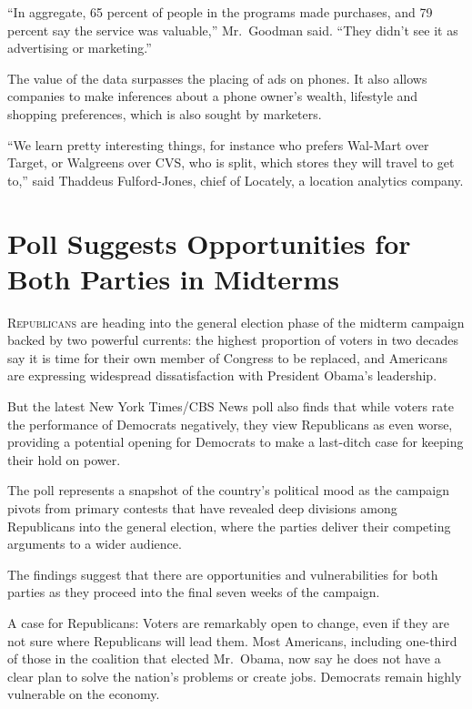 ﻿\documentclass[12pt]{article}
\begin{document}
``In aggregate, 65 percent of people in the programs made purchases, and 79 percent say the service
was valuable,'' Mr.~Goodman said. ``They didn't see it as advertising or marketing.''

The value of the data surpasses the placing of ads on phones. It also allows companies to make
inferences about a phone owner's wealth, lifestyle and shopping preferences, which is also sought by
marketers.

``We learn pretty interesting things, for instance who prefers Wal-Mart over Target, or Walgreens
over CVS, who is split, which stores they will travel to get to,'' said Thaddeus Fulford-Jones,
chief of Locately, a location analytics company.

\pagebreak
\section{Poll Suggests Opportunities for Both Parties in Midterms}

\lettrine{R}{epublicans} are heading into the general election phase of the
midterm campaign backed by two powerful currents: the highest proportion of voters in two decades
say it is time for their own member of Congress to be replaced, and Americans are expressing
widespread dissatisfaction with President Obama's leadership.

But the latest New York Times/CBS News poll also finds that while voters rate the performance of
Democrats negatively, they view Republicans as even worse, providing a potential opening for
Democrats to make a last-ditch case for keeping their hold on power.

The poll represents a snapshot of the country's political mood as the campaign pivots from primary
contests that have revealed deep divisions among Republicans into the general election, where the
parties deliver their competing arguments to a wider audience.

The findings suggest that there are opportunities and vulnerabilities for both parties as they
proceed into the final seven weeks of the campaign.

A case for Republicans: Voters are remarkably open to change, even if they are not sure where
Republicans will lead them. Most Americans, including one-third of those in the coalition that
elected Mr.~Obama, now say he does not have a clear plan to solve the nation's problems or create
jobs. Democrats remain highly vulnerable on the economy.
\end{document}

